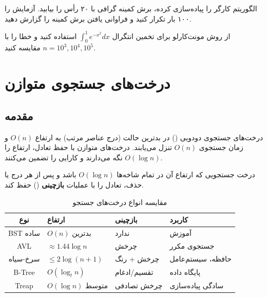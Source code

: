 \documentclass{matinbook}
\begin{document}
    \begin{exercise}
        الگوریتم کارگر را پیاده‌سازی کرده،
        برش کمینه گرافی با ۲۰ رأس را بیابید.
        آزمایش را ۱۰۰ بار تکرار کنید
        و فراوانی یافتن برش کمینه را گزارش دهید.
        \label{exc:karger-experiment}
    \end{exercise}
    
    \begin{exercise}
        از روش مونت‌کارلو برای تخمین
        انتگرال $\int_{0}^{1} e^{-x^{2}} dx$
        استفاده کنید و خطا را با
        $n = 10^{3}, 10^{4}, 10^{5}$ مقایسه کنید.
        \label{exc:monte-carlo-integral}
    \end{exercise}
    
    
    
    
    \chapter{درخت‌های جستجوی متوازن}
    \label{chap:balanced-trees}
    
    \section{مقدمه}
    
    درخت‌های جستجوی دودویی
    () در بدترین حالت (درج عناصر مرتب)
    به ارتفاع $O(n)$ و زمان جستجوی $O(n)$
    تنزل می‌یابند. درخت‌های متوازن
    با حفظ تعادل، ارتفاع را $O(\log n)$
    نگه می‌دارند و کارایی را تضمین می‌کنند.
    
    \begin{definition}
        درخت جستجویی که ارتفاع آن
        در تمام شاخه‌ها $O(\log n)$ باشد
        و پس از هر درج یا حذف،
        تعادل را با عملیات \textbf{بازچینی}
        () حفظ کند.
        \label{def:balanced-tree}
    \end{definition}
    
    \begin{table}[h]
        \centering
        \caption{مقایسه انواع درخت‌های جستجو}
        \label{tab:tree-comparison}
        \begin{tabular}{|c|C{3cm}|C{3cm}|C{3cm}|}
            \hline
            \textbf{نوع} & \textbf{ارتفاع} & \textbf{بازچینی} & \textbf{کاربرد} \\
            \hline
            BST ساده & $O(n)$ بدترین & ندارد & آموزش \\
            AVL & $\approx 1.44 \log n$ & چرخش & جستجوی مکرر \\
            سرخ-سیاه & $\leq 2\log(n+1)$ & چرخش + رنگ & حافظه، سیستم‌عامل \\
            B-Tree & $O(\log_{t} n)$ & تقسیم/ادغام & پایگاه داده \\
            Treap & $O(\log n)$ متوسط & چرخش تصادفی & سادگی پیاده‌سازی \\
            \hline
        \end{tabular}
    \end{table}
    
\end{document}
